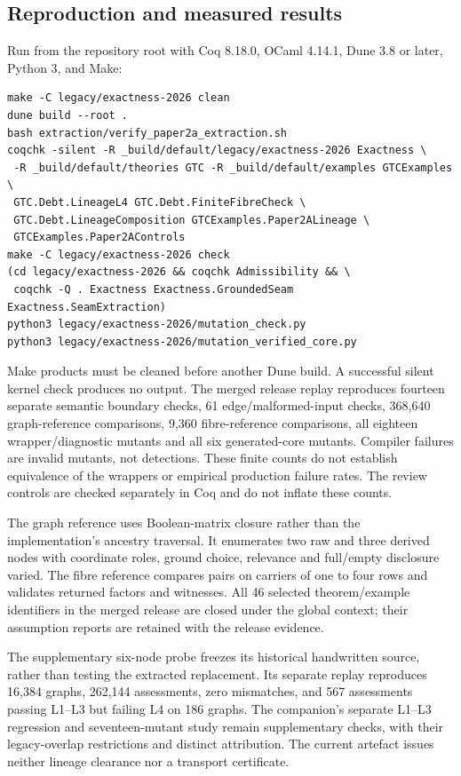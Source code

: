 \documentclass[smallextended,envcountsect,envcountsame,natbib]{svjour3}
\begin{document}
\subsection{Reproduction and measured results}
Run from the repository root with Coq 8.18.0, OCaml 4.14.1, Dune 3.8 or later, Python 3, and Make:
\begin{verbatim}
make -C legacy/exactness-2026 clean
dune build --root .
bash extraction/verify_paper2a_extraction.sh
coqchk -silent -R _build/default/legacy/exactness-2026 Exactness \
 -R _build/default/theories GTC -R _build/default/examples GTCExamples \
 GTC.Debt.LineageL4 GTC.Debt.FiniteFibreCheck \
 GTC.Debt.LineageComposition GTCExamples.Paper2ALineage \
 GTCExamples.Paper2AControls
make -C legacy/exactness-2026 check
(cd legacy/exactness-2026 && coqchk Admissibility && \
 coqchk -Q . Exactness Exactness.GroundedSeam Exactness.SeamExtraction)
python3 legacy/exactness-2026/mutation_check.py
python3 legacy/exactness-2026/mutation_verified_core.py
\end{verbatim}
Make products must be cleaned before another Dune build. A successful silent kernel check produces no output. The merged release replay reproduces fourteen separate semantic boundary checks, 61 edge/malformed-input checks, 368,640 graph-reference comparisons, 9,360 fibre-reference comparisons, all eighteen wrapper/diagnostic mutants and all six generated-core mutants. Compiler failures are invalid mutants, not detections. These finite counts do not establish equivalence of the wrappers or empirical production failure rates. The review controls are checked separately in Coq and do not inflate these counts.

The graph reference uses Boolean-matrix closure rather than the implementation's ancestry traversal. It enumerates two raw and three derived nodes with coordinate roles, ground choice, relevance and full/empty disclosure varied. The fibre reference compares pairs on carriers of one to four rows and validates returned factors and witnesses. All 46 selected theorem/example identifiers in the merged release are closed under the global context; their assumption reports are retained with the release evidence.

The supplementary six-node probe freezes its historical handwritten source, rather than testing the extracted replacement. Its separate replay reproduces 16,384 graphs, 262,144 assessments, zero mismatches, and 567 assessments passing L1--L3 but failing L4 on 186 graphs. The companion's separate L1--L3 regression and seventeen-mutant study remain supplementary checks, with their legacy-overlap restrictions and distinct attribution. The current artefact issues neither lineage clearance nor a transport certificate.



\end{document}

